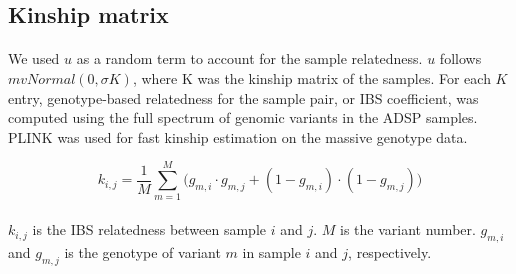 \documentclass[12pt]{article}
\begin{document}

\subsection*{Kinship matrix}

\paragraph{}{
We used $u$ as a random term to account for the sample relatedness. $u$ follows $mvNormal(0, \sigma K)$, where K was the kinship matrix of the samples. For each $K$ entry, genotype-based relatedness for the sample pair, or IBS coefficient, was computed using the full spectrum of genomic variants in the ADSP samples. PLINK was used for fast kinship estimation on the massive genotype data.
}

\begin{equation}
k_{i, j}  = \frac{1}{M} \sum_{m = 1}^M ({g_{m, i}  \cdot g_{m, j} + (1 - g_{m, i}) \cdot (1 - g_{m, j}))}
\end{equation}

\paragraph{}{
$k_{i, j}$ is the IBS relatedness between sample $i$ and $j$. $M$ is the variant number. $g_{m, i}$ and $g_{m, j}$ is the genotype of variant $m$ in sample $i$ and $j$, respectively.
}

\end{document}
